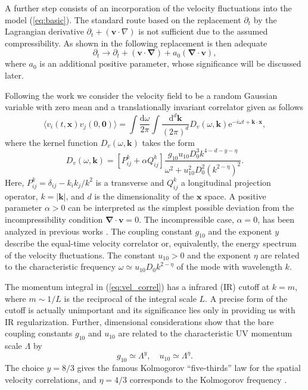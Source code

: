 \documentclass[aps,pre,url,twocolumn,superscriptaddress]{revtex4-1}
\def\mk{{\bm k}}
\def\mx{{\bm x}}
\def\boldnabla{{\bm \nabla}}
\begin{document}
A further step consists of an incorporation of the velocity fluctuations into
the model (\ref{eq:basic}). The 
 standard route \cite{Landau_fluid} based on 
   the replacement $\partial_t$ by the Lagrangian derivative $\partial_t +({\bm v}\cdot\nabla)$ 
   is not sufficient due to the assumed compressibility. As shown in \cite{AntKap10} the following
   replacement is then adequate
\begin{equation}
  \partial_t \rightarrow \partial_t +({\bm v}\cdot\boldnabla)+a_0 ({\bm \nabla}\cdot{\bm v}),
  \label{eq:subs}
\end{equation}
where $a_0$ is an additional positive parameter, whose significance will be discussed later.
 
Following the work \cite{Ant00} we
 consider the velocity field to be a random Gaussian variable with zero mean and 
 a translationally invariant correlator given as follows
\begin{equation}
  \langle v_i(t,{\bm x}) v_j (0,{\bm 0}) \rangle =
  \int \frac{{\mathrm d} \omega}{2\pi}
  \int \frac{{\mathrm d}^d {\bm k}}{(2\pi)^d} 
  D_v (\omega,\mk) {\mathrm e}^{-i\omega  t  +{\bm k}\cdot {\bm x}},
  \label{eq:vel_correl}
\end{equation}
where the kernel function $D_v(\omega,\mk)$ takes the form
% 
\begin{equation}
  D_v (\omega,\mk) = [P_{ij}^{k} + \alpha Q_{ij}^{k}]
  \frac{g_{10} u_{10} D_0^3 k^{4-d-y-\eta}}{\omega^2 + u_{10}^2 D_0^2 (k^{2-\eta})^2}.
  \label{eq:kernelD}
\end{equation}
Here, $P_{ij}^k = \delta_{ij}-k_ik_j/k^2$ is a transverse  and $Q_{ij}^k$ a longitudinal
projection
operator, $k=|\mk|$, and $d$ is the 
dimensionality of the $\mx$ space.
A positive parameter $\alpha>0$ can be interpreted as the simplest possible
deviation \cite{AdzAnt98} from the incompressibility condition ${\bm \nabla}\cdot {\bm v} = 0$.
The incompressible case, $\alpha=0$, has been analyzed in previous works \cite{AntKap08,AntKap10,DP13}.
The coupling constant $g_{10}$ and the exponent $y$ describe the equal-time velocity
correlator or, equivalently, the energy spectrum \cite{Ant99,Ant00,Frisch} of the velocity
fluctuations. The constant $u_{10}>0$ and the exponent $\eta$ are related
to the characteristic frequency $\omega \simeq u_{10} D_0 k^{2-\eta}$ of the mode with
wavelength $k$.

The momentum integral in (\ref{eq:vel_correl}) has a infrared (IR) cutoff at $k = m$, where $m \sim 1/L $ is the
reciprocal of the integral scale $L$. A precise form of the cutoff \cite{turbo,Ant06} is actually
unimportant and its significance lies only in providing us with IR regularization.
Further, dimensional considerations show that the bare coupling constants $g_{10}$ and $u_{10}$
are related to the characteristic UV momentum scale $\Lambda$ by
\begin{equation}
   g_{10} \simeq \Lambda^y,\quad
   u_{10} \simeq \Lambda^\eta.
\end{equation}
The choice $y = 8/3$ gives the famous Kolmogorov ``five-thirds'' law for
the spatial velocity correlations, and $\eta=4/3$ corresponds to the Kolmogorov
frequency \cite{Frisch}.
\end{document}
